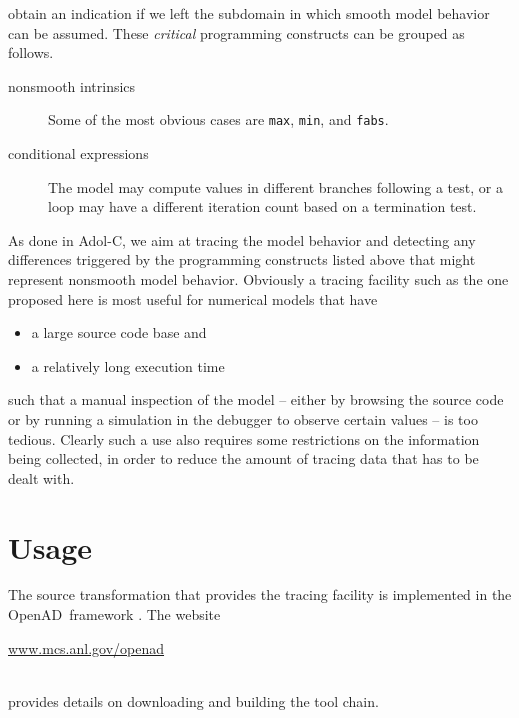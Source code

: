 \documentclass{article}
\newcommand{\adolc}{\mbox{Adol-C}}
\newcommand{\openad}{OpenAD}
\begin{document}
obtain an indication  if we left the subdomain in which smooth model behavior 
can be assumed. 
These {\em critical} programming constructs can be grouped as follows.
\begin{description}
\item[nonsmooth intrinsics] Some of the most obvious cases are \lstinline{max}, \lstinline{min}, and \lstinline{fabs}.
\item[conditional expressions] The model may compute values in different branches following a test, 
or a loop may have a different iteration count based on a termination test.
\end{description}
As done in \adolc, we aim at tracing the model behavior and detecting any differences triggered 
by the programming constructs listed above that might represent nonsmooth model behavior.
Obviously a tracing facility such as the one proposed here is most useful for 
numerical models that have 
\begin{itemize}
\item a large source code base and 
\item a relatively long execution time
\end{itemize}
such that a manual inspection of the model -- either by browsing the source code or 
by running a simulation in the debugger to observe certain values -- is too tedious.
Clearly such a use also requires some restrictions on the information being 
collected, in order to reduce the amount of tracing data that has to be dealt with.


\section{Usage}

The source transformation that provides the tracing facility is implemented in the 
\openad\ framework \cite{openad}. The website\\[1ex] 
\centerline{\url{www.mcs.anl.gov/openad}}\\[1ex]
provides details on downloading and building the tool chain. 

\end{document}
